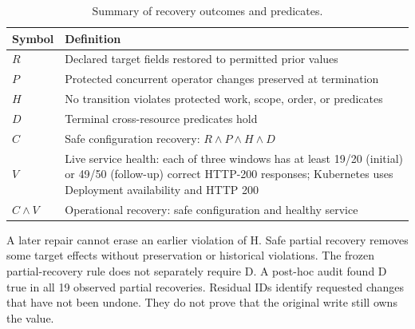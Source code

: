\documentclass[conference,10pt]{IEEEtran}
\begin{document}
\begin{table}[t]

\caption{Summary of recovery outcomes and predicates.}

\label{tab:1}

\centering\footnotesize

\setlength{\tabcolsep}{3pt}

\renewcommand{\arraystretch}{1.08}

\begin{tabular}{@{}l>{\raggedright\arraybackslash}p{}@{}}

\toprule

Symbol & Definition \\

\midrule

$R$ & Declared target fields restored to permitted prior values \\

$P$ & Protected concurrent operator changes preserved at termination \\

$H$ & No transition violates protected work, scope, order, or predicates \\

$D$ & Terminal cross\hyp{}resource predicates hold \\

$C$ & Safe configuration recovery: $R \land P \land H \land D$ \\

$V$ & Live service health: each of three windows has at least 19/20 (initial) or 49/50 (follow\hyp{}up) correct HTTP-200 responses; Kubernetes uses Deployment availability and HTTP 200 \\

$C \land V$ & Operational recovery: safe configuration and healthy service \\

\bottomrule

\end{tabular}
\par\vspace{-14pt}
\end{table}

A later repair cannot erase an earlier violation of H. Safe partial recovery removes some target effects without preservation or historical violations. The frozen partial\hyp{}recovery rule does not separately require D. A post\hyp{}hoc audit found D true in all 19 observed partial recoveries. Residual IDs identify requested changes that have not been undone. They do not prove that the original write still owns the value.
\end{document}
